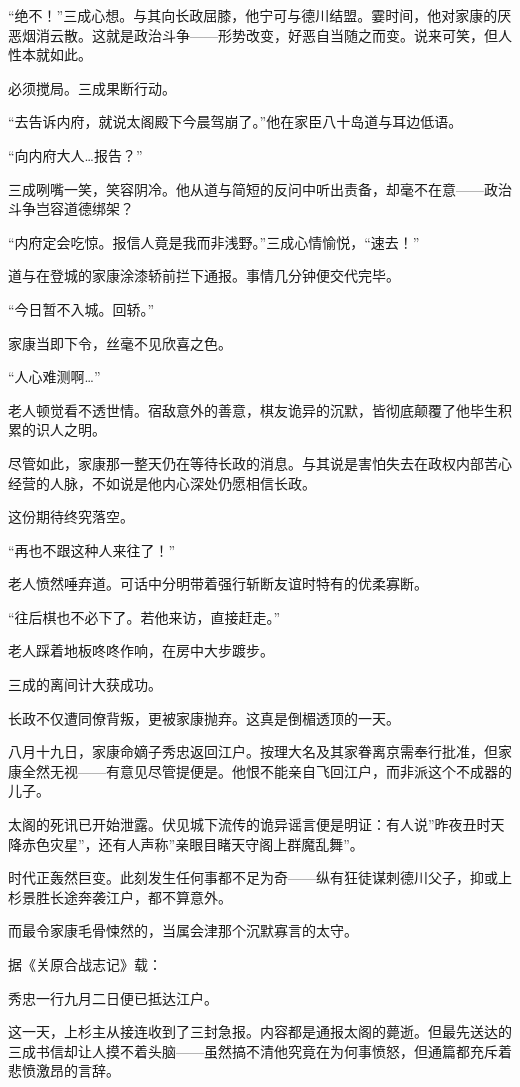 \documentclass[
]{article}
\begin{document}
``绝不！''三成心想。与其向长政屈膝，他宁可与德川结盟。霎时间，他对家康的厌恶烟消云散。这就是政治斗争------形势改变，好恶自当随之而变。说来可笑，但人性本就如此。

必须搅局。三成果断行动。

``去告诉内府，就说太阁殿下今晨驾崩了。''他在家臣八十岛道与耳边低语。

``向内府大人\ldots 报告？''

三成咧嘴一笑，笑容阴冷。他从道与简短的反问中听出责备，却毫不在意------政治斗争岂容道德绑架？

``内府定会吃惊。报信人竟是我而非浅野。''三成心情愉悦，``速去！''

道与在登城的家康涂漆轿前拦下通报。事情几分钟便交代完毕。

``今日暂不入城。回轿。''

家康当即下令，丝毫不见欣喜之色。

``人心难测啊\ldots{}''

老人顿觉看不透世情。宿敌意外的善意，棋友诡异的沉默，皆彻底颠覆了他毕生积累的识人之明。

尽管如此，家康那一整天仍在等待长政的消息。与其说是害怕失去在政权内部苦心经营的人脉，不如说是他内心深处仍愿相信长政。

这份期待终究落空。

``再也不跟这种人来往了！''

老人愤然唾弃道。可话中分明带着强行斩断友谊时特有的优柔寡断。

``往后棋也不必下了。若他来访，直接赶走。''

老人踩着地板咚咚作响，在房中大步踱步。

三成的离间计大获成功。

长政不仅遭同僚背叛，更被家康抛弃。这真是倒楣透顶的一天。

八月十九日，家康命嫡子秀忠返回江户。按理大名及其家眷离京需奉行批准，但家康全然无视------有意见尽管提便是。他恨不能亲自飞回江户，而非派这个不成器的儿子。

太阁的死讯已开始泄露。伏见城下流传的诡异谣言便是明证：有人说''昨夜丑时天降赤色灾星''，还有人声称''亲眼目睹天守阁上群魔乱舞''。

时代正轰然巨变。此刻发生任何事都不足为奇------纵有狂徒谋刺德川父子，抑或上杉景胜长途奔袭江户，都不算意外。

而最令家康毛骨悚然的，当属会津那个沉默寡言的太守。

据《关原合战志记》载：

秀忠一行九月二日便已抵达江户。

这一天，上杉主从接连收到了三封急报。内容都是通报太阁的薨逝。但最先送达的三成书信却让人摸不着头脑------虽然搞不清他究竟在为何事愤怒，但通篇都充斥着悲愤激昂的言辞。
\end{document}
